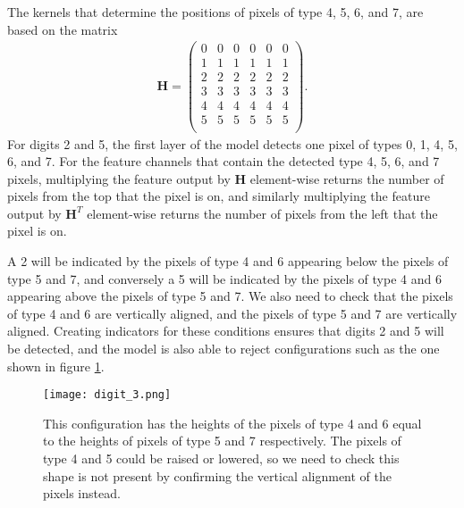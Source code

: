 \documentclass{somasmsc}
\begin{document}
The kernels that determine the positions of pixels of type 4, 5, 6, and 7, are based on the matrix
\begin{align*}
    \mathbf{H} =
    \begin{pmatrix}
        0 & 0 & 0 & 0 & 0 & 0 \\
        1 & 1 & 1 & 1 & 1 & 1 \\
        2 & 2 & 2 & 2 & 2 & 2 \\
        3 & 3 & 3 & 3 & 3 & 3 \\
        4 & 4 & 4 & 4 & 4 & 4 \\
        5 & 5 & 5 & 5 & 5 & 5 \\
    \end{pmatrix}.
\end{align*}
For digits 2 and 5, the first layer of the model detects one pixel of types 0, 1, 4, 5, 6, and 7. For the feature channels that contain the detected type 4, 5, 6, and 7 pixels, multiplying the feature output by $\mathbf{H}$ element-wise returns the number of pixels from the top that the pixel is on, and similarly multiplying the feature output by $\mathbf{H}^T$ element-wise returns the number of pixels from the left that the pixel is on.

A 2 will be indicated by the pixels of type 4 and 6 appearing below the pixels of type 5 and 7, and conversely a 5 will be indicated by the pixels of type 4 and 6 appearing above the pixels of type 5 and 7. We also need to check that the pixels of type 4 and 6 are vertically aligned, and the pixels of type 5 and 7 are vertically aligned. Creating indicators for these conditions ensures that digits 2 and 5 will be detected, and the model is also able to reject configurations such as the one shown in figure \ref{digit:fig3}.

\begin{figure}[H]\label{digit:fig3}
\begin{center}
\texttt{[image: digit\_3.png]}
\end{center}
\caption{This configuration has the heights of the pixels of type 4 and 6 equal to the heights of pixels of type 5 and 7 respectively. The pixels of type 4 and 5 could be raised or lowered, so we need to check this shape is not present by confirming the vertical alignment of the pixels instead.}
\end{figure}
\end{document}
